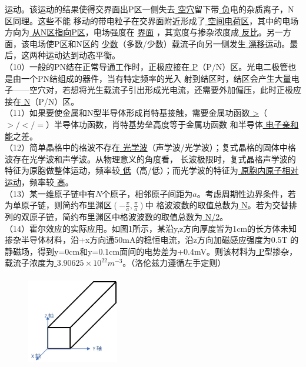 \documentclass[UTF8]{ctexart}
\begin{document}
运动。该运动的结果使得交界面出P区一侧失去\uline{{\color{white} 空穴}}留下带\uline{{\color{white} 负}}电的杂质离子，N区同理。这些不能
移动的带电粒子在交界面附近形成了\uline{{\color{white} 空间电荷区}}，其中的电场方向为\uline{{\color{white} 从N区指向P区}}，电场强度在
\uline{{\color{white} 界面}} ，其宽度与掺杂浓度成\uline{{\color{white} 反比}}。另一方面，该电场使P区和N区的
\uline{{\color{white} 少数}}（多数/少数）载流子向另一侧发生\uline{{\color{white} 漂移}}运动。最后，这两种运动达到动态平衡。\\
（10）一般的PN结在正常导通工作时，正极应接在\uline{{\color{white} P}}（P/N）区。光电二极管也是由一个PN结组成的器件，当有特定频率的光入
射到结区时，结区会产生大量电子——空穴对，若想将光生载流子引出形成光电流，还需要外加偏压，此时正极应接在\uline{{\color{white} N}}（P/N）区。\\
（11）如果要使金属和N型半导体形成肖特基接触，需要金属功函数\uline{{\color{white} >}}（$>/</=$）半导体功函数，肖特基势垒高度等于金属功函数
和半导体\uline{{\color{white} 电子亲和能}}之差。\\
（12）简单晶格中的格波不存在\uline{{\color{white} 光学波}}（声学波/光学波）；复式晶格的固体中格波存在光学波和声学波。从物理意义的角度看，
长波极限时，复式晶格声学波的特征为原胞做整体运动，频率较\uline{{\color{white} 低}}（高/低）；而光学波的特征为\uline{{\color{white} 
原胞内原子相对运动}}，频率较\uline{{\color{white} 高}}。\\
（13）某一维原子链中有$N$个原子，相邻原子间距为$a$。考虑周期性边界条件，若为单原子链，则简约布里渊区$(-\frac{\pi}{a},\frac{\pi}{a})$中
格波波数的取值总数为\uline{{\color{white} N}}。若为交替排列的双原子链，简约布里渊区中格波波数的取值总数为\uline{{\color{white} N/2}}。\\
（14）霍尔效应的实际应用。如图1所示，某沿y,z方向厚度皆为1cm的长方体未知掺杂半导体材料，沿+x方向通50mA的稳恒电流，沿z方向加磁感应强度为0.5T
的静磁场，得到y=0cm和y=0.1cm面间的电势差为+0.4mV。则该材料为\uline{{\color{white} P}}型掺杂，载流子浓度为\uline{{\color{white} 
$3.90625\times10^{22}m^{-3}$}}。（洛伦兹力遵循左手定则）\\
\begin{figure}[H]                                        
    \centering                                                
    \includegraphics[width=4cm,height=4cm]{图1.jpg}        
    \caption{}                                                                                  
\end{figure}                                              
\end{document}
